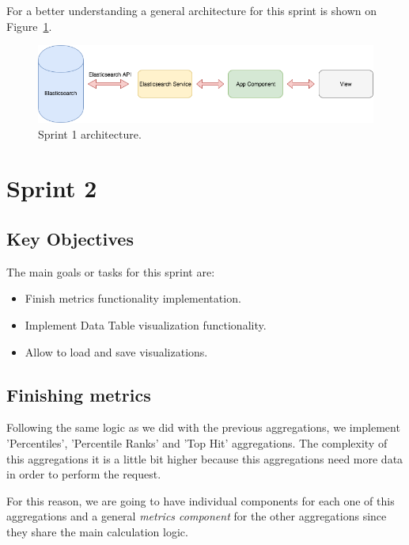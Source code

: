 \documentclass[a4paper, 12pt, english]{book}
\begin{document}
For a better understanding a general architecture for this sprint is shown on Figure~\ref{fig:sprint1-architecture}.
\begin{figure}
  \centering
  \includegraphics[width=13cm, keepaspectratio]{img/sprint1_architecture}
  \caption{Sprint 1 architecture.}
  \label{fig:sprint1-architecture}
\end{figure}


\section{Sprint 2}
\label{sec:sprint-2}
\subsection{Key Objectives}
\label{sec:key-objectives}

The main goals or tasks for this sprint are:
\begin{itemize}
    \item Finish metrics functionality implementation.
    \item Implement Data Table visualization functionality.
    \item Allow to load and save visualizations.
\end{itemize}

\subsection{Finishing metrics}
\label{sec:finishing-metrics}
Following the same logic as we did with the previous aggregations, we implement 'Percentiles', 'Percentile Ranks' and 'Top Hit' aggregations. The complexity of this aggregations it is a little bit higher because this aggregations need more data in order to perform the request.

For this reason, we are going to have individual components for each one of this aggregations and a general \textit{metrics component} for the other aggregations since they share the main calculation logic.
\end{document}
